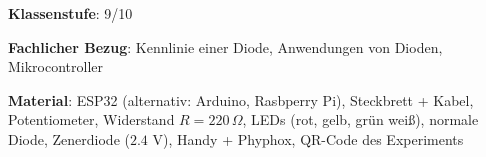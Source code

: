\documentclass[../main.tex]{subfiles}
\begin{document}
\begin{tcolorbox}[
    width=\textwidth,
    height=\textheight,
    title=Phyphox: Kennlinien von verschiedenen Dioden,
    fonttitle=\Large,
    before title=\vspace{0.2cm}, after title=\vspace{0.2cm},
    colback=white,
    title filled=true, 
    colbacktitle=myorange,
    colframe=black,
    coltitle=black,
    ]

    \vspace{0.2cm}

    \textbf{Klassenstufe}: 9/10

    \vspace{0.5cm}

    \textbf{Fachlicher Bezug}: Kennlinie einer Diode, Anwendungen von Dioden, Mikrocontroller 

    \vspace{0.5cm}
        \textbf{Material}: ESP32 (alternativ: Arduino, Rasbperry Pi), Steckbrett + Kabel, Potentiometer, Widerstand $R=220\,\Omega$, LEDs (rot, gelb, grün weiß), normale Diode, Zenerdiode ($2.4$ V), Handy + Phyphox, QR-Code des Experiments

        

\end{tcolorbox}
\end{document}

